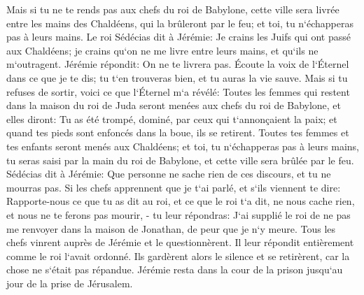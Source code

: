 \verse Mais si tu ne te rends pas aux chefs du roi de Babylone, cette ville sera livrée entre les mains des Chaldéens, qui la brûleront par le feu; et toi, tu n`échapperas pas à leurs mains. 
\verse Le roi Sédécias dit à Jérémie: Je crains les Juifs qui ont passé aux Chaldéens; je crains qu`on ne me livre entre leurs mains, et qu`ils ne m`outragent. 
\verse Jérémie répondit: On ne te livrera pas. Écoute la voix de l`Éternel dans ce que je te dis; tu t`en trouveras bien, et tu auras la vie sauve. 
\verse Mais si tu refuses de sortir, voici ce que l`Éternel m`a révélé: 
\verse Toutes les femmes qui restent dans la maison du roi de Juda seront menées aux chefs du roi de Babylone, et elles diront: Tu as été trompé, dominé, par ceux qui t`annonçaient la paix; et quand tes pieds sont enfoncés dans la boue, ils se retirent. 
\verse Toutes tes femmes et tes enfants seront menés aux Chaldéens; et toi, tu n`échapperas pas à leurs mains, tu seras saisi par la main du roi de Babylone, et cette ville sera brûlée par le feu. 
\verse Sédécias dit à Jérémie: Que personne ne sache rien de ces discours, et tu ne mourras pas. 
\verse Si les chefs apprennent que je t`ai parlé, et s`ils viennent te dire: Rapporte-nous ce que tu as dit au roi, et ce que le roi t`a dit, ne nous cache rien, et nous ne te ferons pas mourir, - 
\verse tu leur répondras: J`ai supplié le roi de ne pas me renvoyer dans la maison de Jonathan, de peur que je n`y meure. 
\verse Tous les chefs vinrent auprès de Jérémie et le questionnèrent. Il leur répondit entièrement comme le roi l`avait ordonné. Ils gardèrent alors le silence et se retirèrent, car la chose ne s`était pas répandue. 
\verse Jérémie resta dans la cour de la prison jusqu`au jour de la prise de Jérusalem. 

